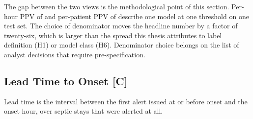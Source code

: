 The gap between the two views is the methodological point of this section.
Per-hour PPV of \pcPpvPrimaryB{} and per-patient PPV of \pcPatientPpvPrimaryB{} describe one model at one
threshold on one test set. The choice of denominator moves the headline number
by a factor of twenty-six, which is larger than the spread this thesis
attributes to label definition (H1) or model class (H6). Denominator choice
belongs on the list of analyst decisions that require pre-specification.

\subsection{Lead Time to Onset \texorpdfstring{[C]}{[C]}}

Lead time is the interval between the first alert issued at or before onset
and the onset hour, over septic stays that were alerted at all.

